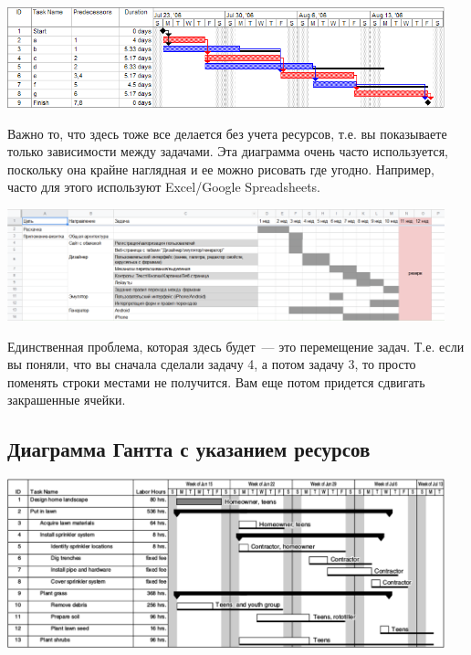\documentclass{../../text-style}
\begin{document}
\begin{center}
    \includegraphics[width=0.95\textwidth]{ganttChart.png}
\end{center}

Важно то, что здесь тоже все делается без учета ресурсов, т.е. вы показываете только зависимости между задачами. Эта диаграмма очень часто используется, поскольку она крайне наглядная и ее можно рисовать где угодно. Например, часто для этого используют Excel/Google Spreadsheets. 

\begin{center}
    \includegraphics[width=0.95\textwidth]{ganttChartExample.png}
\end{center}

Единственная проблема, которая здесь будет~--- это перемещение задач. Т.е. если вы поняли, что вы сначала сделали задачу 4, а потом задачу 3, то просто поменять строки местами не получится. Вам еще потом придется сдвигать закрашенные ячейки.

\subsection{Диаграмма Гантта с указанием ресурсов}

\begin{center}
    \includegraphics[width=0.95\textwidth]{ganttChartWithResources.png}
\end{center}
\end{document}
